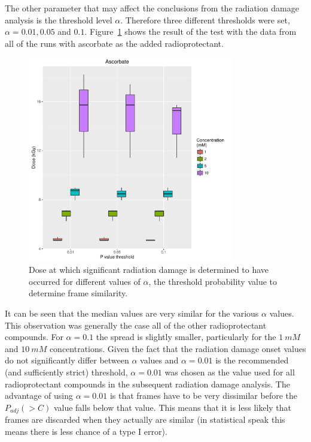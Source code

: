 The other parameter that may affect the conclusions from the radiation damage analysis is the threshold level $\alpha$. Therefore three different thresholds were set, $\alpha = 0.01, 0.05$ and $0.1$.
Figure~\ref{fig:alpha threshold value test} shows the result of the test with the data from all of the runs with ascorbate as the added radioprotectant.
\begin{figure}
    \centering
    \includegraphics[width=0.8\textwidth]{figures/saxs/Ascorbate_PThresh_comp.pdf}
    \caption{Dose at which significant radiation damage is determined to have occurred for different values of $\alpha$, the threshold probability value to determine frame similarity.}
    \label{fig:alpha threshold value test}
\end{figure}
It can be seen that the median values are very similar for the various $\alpha$ values.
This observation was generally the case all of the other radioprotectant compounds.
For $\alpha = 0.1$ the spread is slightly smaller, particularly for the $1\ mM$ and $10\ mM$ concentrations.
Given the fact that the radiation damage onset values do not significantly differ between $\alpha$ values and $\alpha = 0.01$ is the recommended (and sufficiently strict) threshold, $\alpha = 0.01$ was chosen as the value used for all radioprotectant compounds in the subsequent radiation damage analysis.
The advantage of using $\alpha = 0.01$ is that frames have to be very dissimilar before the $P_{adj}(>C)$ value falls below that value.
This means that it is less likely that frames are discarded when they actually are similar (in statistical speak this means there is less chance of a type I error).
